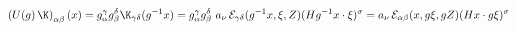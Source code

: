\begin{equation}\label{eq:graction}
\left(U(g) \,\K\right)_{\alpha\beta}(x) = g_{\alpha}^{\gamma}
g_{\beta}^{\delta}\K_{\gamma \delta}(g^{-1} x)=g_{\alpha}^{\gamma}
g_{\beta}^{\delta}\,\,a_{\nu}\,{\cal
E}_{\gamma\delta}(g^{-1}x,\xi,Z)(H g^{-1}x\cdot
\xi)^{\sigma}=a_{\nu}\,{\cal E}_{\alpha\beta}(x,g\xi,gZ)(Hx\cdot
g\xi)^{\sigma}
\end{equation}

